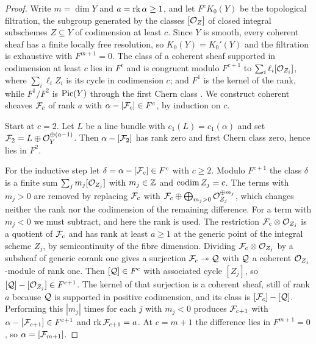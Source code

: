 \begin{proof}
Write $m=\dim Y$ and $a=\operatorname{rk}\alpha\ge1$, and let $F^{c}K_{0}(Y)$ be the
topological filtration, the subgroup generated by the classes $[\mathcal{O}_{Z}]$ of
closed integral subschemes $Z\subseteq Y$ of codimension at least $c$. Since
$Y$ is smooth, every coherent sheaf has a finite locally free resolution, so
$K_{0}(Y)=K_{0}'(Y)$ and the filtration is exhaustive with $F^{m+1}=0$.
The class of a coherent sheaf supported in codimension at least $c$
lies in $F^{c}$ and is congruent modulo $F^{c+1}$ to
$\sum_{i}\ell_{i}[\mathcal{O}_{Z_{i}}]$, where $\sum_{i}\ell_{i}Z_{i}$ is its cycle in
codimension $c$; and $F^{1}$ is the kernel of the rank, while $F^{1}/F^{2}$ is
$\operatorname{Pic}(Y)$ through the first Chern class \cite[\S 15.1 and
Ex.~15.1.5]{Ful98}. We construct coherent
sheaves $\mathcal{F}_{c}$ of rank $a$ with $\alpha-[\mathcal{F}_{c}]\in F^{c}$, by induction on
$c$.

Start at $c=2$. Let $L$ be a line bundle with $c_{1}(L)=c_{1}(\alpha)$ and set
$\mathcal{F}_{2}=L\oplus\mathcal{O}_{Y}^{\oplus(a-1)}$. Then $\alpha-[\mathcal{F}_{2}]$ has rank zero
and first Chern class zero, hence lies in $F^{2}$.

For the inductive step let $\delta=\alpha-[\mathcal{F}_{c}]\in F^{c}$ with $c\ge2$.
Modulo $F^{c+1}$ the class $\delta$ is a finite sum $\sum_{j}m_{j}
[\mathcal{O}_{Z_{j}}]$ with $m_{j}\in\mathbb{Z}$ and $\operatorname{codim} Z_{j}=c$. The terms with
$m_{j}>0$ are removed by replacing $\mathcal{F}_{c}$ with $\mathcal{F}_{c}\oplus\bigoplus_{
m_{j}>0}\mathcal{O}_{Z_{j}}^{\oplus m_{j}}$, which changes neither the rank nor the
codimension of the remaining difference. For a term with $m_{j}<0$ we must
subtract, and here the rank is used. The restriction $\mathcal{F}_{c}\otimes
\mathcal{O}_{Z_{j}}$ is a quotient of $\mathcal{F}_{c}$ and has rank at least $a\ge1$ at the
generic point of the integral scheme $Z_{j}$, by semicontinuity of the fibre
dimension. Dividing $\mathcal{F}_{c}\otimes\mathcal{O}_{Z_{j}}$ by a subsheaf of generic
corank one gives a surjection $\mathcal{F}_{c}\twoheadrightarrow\mathcal{Q}$ with $\mathcal{Q}$ a
coherent $\mathcal{O}_{Z_{j}}$-module of rank one. Then $[\mathcal{Q}]\in F^{c}$ with
associated cycle $[Z_{j}]$, so $[\mathcal{Q}]-[\mathcal{O}_{Z_{j}}]\in F^{c+1}$. The kernel of
that surjection is a coherent sheaf, still of rank $a$ because $\mathcal{Q}$ is
supported in positive codimension, and its class is $[\mathcal{F}_{c}]-[\mathcal{Q}]$.
Performing this $|m_{j}|$ times for each $j$ with $m_{j}<0$ produces
$\mathcal{F}_{c+1}$ with $\alpha-[\mathcal{F}_{c+1}]\in F^{c+1}$ and $\operatorname{rk}\mathcal{F}_{c+1}=a$. At
$c=m+1$ the difference lies in $F^{m+1}=0$, so $\alpha=[\mathcal{F}_{m+1}]$.
\end{proof}

